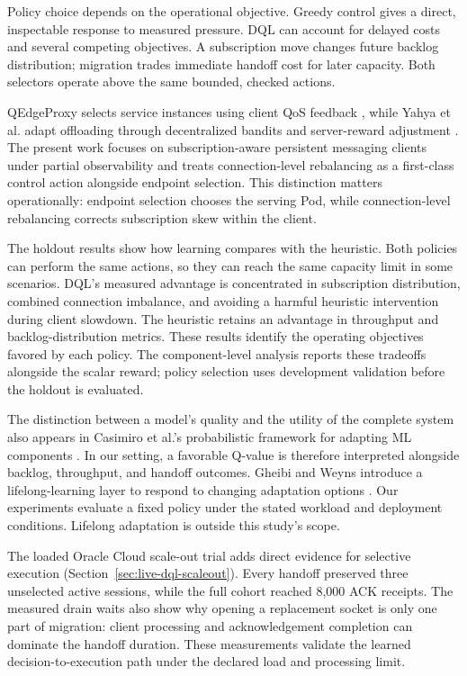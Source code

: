 \documentclass[manuscript]{acmart}
\begin{document}
Policy choice depends on the operational objective. Greedy control gives a
direct, inspectable response to measured pressure. DQL can account for delayed
costs and several competing objectives. A subscription move changes future
backlog distribution; migration trades immediate handoff cost for later
capacity. Both selectors operate above the same bounded, checked actions.

QEdgeProxy selects service instances using client QoS feedback
\cite{Cilic2025}, while Yahya et al. adapt offloading through decentralized
bandits and server-reward adjustment \cite{Yahya2024}. The present work
focuses on subscription-aware persistent messaging clients under partial
observability and treats connection-level rebalancing as a first-class
control action alongside endpoint selection. This distinction
matters operationally: endpoint selection chooses the serving Pod, while
connection-level rebalancing corrects subscription skew within the client.

The holdout results show how learning compares with the heuristic.
Both policies can perform the same actions, so they can reach the same
capacity limit in some scenarios.  DQL's measured advantage is concentrated
in subscription distribution, combined connection imbalance, and avoiding a
harmful heuristic intervention during client slowdown.  The heuristic retains
an advantage in throughput and backlog-distribution metrics. These results
identify the operating objectives favored by each policy. The
component-level analysis reports these tradeoffs alongside the scalar reward;
policy selection uses development validation before the holdout is evaluated.

The distinction between a model's quality and the utility of the complete
system also appears in Casimiro et al.'s probabilistic framework for adapting
ML components \cite{Casimiro2024ModelChecking}. In our setting, a favorable
Q-value is therefore interpreted alongside backlog, throughput, and handoff
outcomes. Gheibi and Weyns introduce a lifelong-learning
layer to respond to changing adaptation options
\cite{Gheibi2024AdaptationDrift}. Our experiments evaluate a fixed policy under
the stated workload and deployment conditions. Lifelong adaptation is outside
this study's scope.

The loaded Oracle Cloud scale-out trial adds direct evidence for selective
execution (Section~\ref{sec:live-dql-scaleout}). Every handoff preserved three
unselected active sessions, while the full cohort reached 8,000 ACK receipts.
The measured drain waits also show why opening a replacement socket is only
one part of migration: client processing and acknowledgement completion can
dominate the handoff duration. These measurements validate the learned
decision-to-execution path under the declared load and processing limit.
\end{document}
